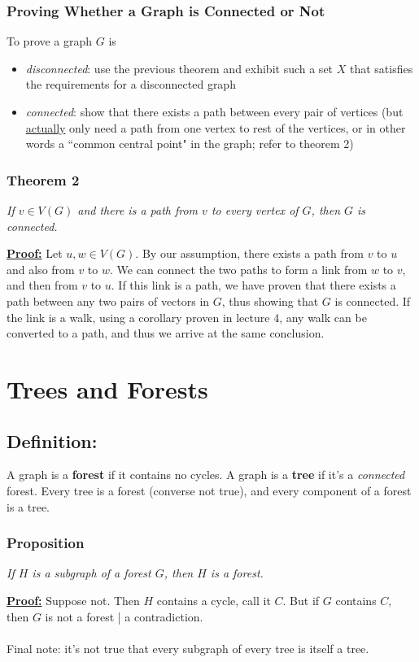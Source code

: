 \documentclass{report}
\begin{document}
\subsubsection{Proving Whether a Graph is Connected or Not}
To prove a graph $G$ is
\begin{itemize}
\item \textit{disconnected}: use the previous theorem and exhibit such a set $X$ that satisfies the requirements for a disconnected graph
\item \textit{connected}: show that there exists a path between every pair of vertices (but \underline{actually} only need a path from one vertex to rest of the vertices, or in other words a ``common central point" in the graph; refer to theorem 2) 
\end{itemize}
\subsubsection{Theorem 2}
\begin{center}
\textit{If $v \in V(G)$ and there is a path from  $v$ to every vertex of $G$, then $G$ is connected.}
\end{center}
\underline{\textbf{Proof:}} Let $u, w \in V(G)$. By our assumption, there exists a path from $v$ to $u$ and also from $v$ to $w$. We can connect the two paths to form a link from $w$ to $v$, and then from $v$ to $u$. If this link is a path, we have proven that there exists a path between any two pairs of vectors in $G$, thus showing that $G$ is connected. If the link is a walk, using a corollary proven in lecture 4, any walk can be converted to a path, and thus we arrive at the same conclusion.
\section{Trees and Forests}
\subsection{Definition:} A graph is a \textbf{forest} if it contains no cycles. A graph is a \textbf{tree} if it's a \textit{connected} forest. Every tree is a forest (converse not true), and every component of a forest is a tree.\subsubsection{Proposition}
\begin{center}
\textit{If $H$ is a subgraph of a forest $G$, then $H$ is a forest.}
\end{center}
\underline{\textbf{Proof:}}
Suppose not. Then $H$ contains a cycle, call it $C$. But if $G$ contains $C$, then $G$ is not a forest | a contradiction.\\\\
Final note: it's not true that every subgraph of every tree is itself a tree.
\end{document}
